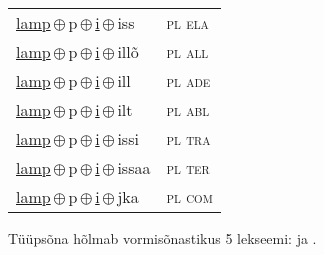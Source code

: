 \begin{minipage}{\textwidth}
\begin{sideways}
\begin{tabular}{l l}
\underline{lamp}\,$\oplus$\,p\,$\oplus$\,\underline{i}\,$\oplus$\,iss & \textsc{ pl ela } \\
\underline{lamp}\,$\oplus$\,p\,$\oplus$\,\underline{i}\,$\oplus$\,illõ & \textsc{ pl all } \\
\underline{lamp}\,$\oplus$\,p\,$\oplus$\,\underline{i}\,$\oplus$\,ill & \textsc{ pl ade } \\
\underline{lamp}\,$\oplus$\,p\,$\oplus$\,\underline{i}\,$\oplus$\,ilt & \textsc{ pl abl } \\
\underline{lamp}\,$\oplus$\,p\,$\oplus$\,\underline{i}\,$\oplus$\,issi & \textsc{ pl tra } \\
\underline{lamp}\,$\oplus$\,p\,$\oplus$\,\underline{i}\,$\oplus$\,issaa & \textsc{ pl ter } \\
\underline{lamp}\,$\oplus$\,p\,$\oplus$\,\underline{i}\,$\oplus$\,jka & \textsc{ pl com } \\
\end{tabular}
\end{sideways}
\label{tab:tüüpsõnamall-lamppi}

\end{minipage}

 
\vspace{1em}
\noindent Tüüpsõna hõlmab vormisõnastikus 5 lekseemi:  ja .
